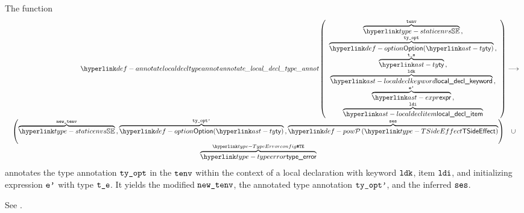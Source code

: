 \hypertarget{def-annotatelocaldecltypeannot}{}
The function
\[
\begin{array}{r}
  \annotatelocaldecltypeannot
  \left(
  \begin{array}{c}
    \overname{\staticenvs}{\tenv} \aslsep \\
    \overname{\Option(\ty)}{\tyopt} \aslsep \\
    \overname{\ty}{\vte} \aslsep \\
    \overname{\localdeclkeyword}{\ldk} \aslsep \\
    \overname{\expr}{\vep} \aslsep\\
    \overname{\localdeclitem}{\ldi}
  \end{array}
  \right)
  \aslto \\
  \begin{array}{cl}
    \left(\overname{\staticenvs}{\newtenv} \aslsep \overname{\Option(\ty)}{\tyoptp} \aslsep \overname{\TSideEffectSet}{\vses}\right)
    & \cup \\
    \overname{\typeerror}{\TypeErrorConfig} &
  \end{array}
\end{array}
\]
annotates the type annotation $\texttt{ty\_opt}$ in the \staticenvironmentterm{} $\texttt{tenv}$ within the context of a local declaration with keyword $\texttt{ldk}$, item $\texttt{ldi}$, and initializing expression $\texttt{e'}$ with type $\texttt{t\_e}$.
It yields the modified \staticenvironmentterm{} $\texttt{new\_tenv}$, the annotated type annotation $\texttt{ty\_opt'}$, and the inferred \sideeffectsetterm{} $\texttt{ses}$.
\ProseOtherwiseTypeError

See .

